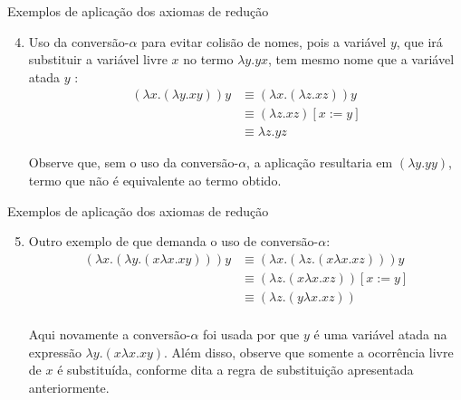 \begin{frame}[fragile]{Exemplos de aplicação dos axiomas de redução}

    \begin{enumerate}
        \setcounter{enumi}{3}
        \item Uso da conversão-$\alpha$ para evitar colisão de nomes, pois a variável $y$, que
        irá substituir a variável livre $x$ no termo $\lambda y.yx$, tem mesmo nome que a
        variável atada $y$ :
        \begin{align*}
            (\lambda x.(\lambda y.xy))y & \equiv (\lambda x.(\lambda z.xz))y \\
            & \equiv (\lambda z.xz)[x:=y] \\
            & \equiv \lambda z.yz
        \end{align*}

        Observe que, sem o uso da conversão-$\alpha$, a aplicação resultaria em $(\lambda y.yy)$,
        termo que não é equivalente ao termo obtido.

    \end{enumerate}

\end{frame}

\begin{frame}[fragile]{Exemplos de aplicação dos axiomas de redução}

    \begin{enumerate}
        \setcounter{enumi}{4}
        \item Outro exemplo de que demanda o uso de conversão-$\alpha$:
        \begin{align*}
            (\lambda x.(\lambda y.(x\lambda x.xy)))y &\equiv (\lambda x.(\lambda z.(x\lambda x.xz)))y\\
            &\equiv (\lambda z.(x\lambda x.xz))[x:=y]\\
            &\equiv (\lambda z.(y\lambda x.xz))\\
        \end{align*}

        Aqui novamente a conversão-$\alpha$ foi usada por que $y$ é uma variável atada na
        expressão $\lambda y.(x\lambda x.xy)$. Além disso, observe que somente a ocorrência
        livre de $x$ é substituída, conforme dita a regra de substituição apresentada 
        anteriormente.
    \end{enumerate}

\end{frame}

